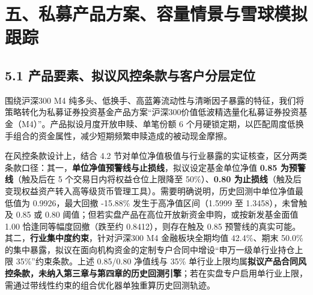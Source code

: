 \documentclass[12pt,a4paper]{article}
\let\origsection\section
\renewcommand{\section}[1]{\needspace{6.5\baselineskip}\origsection{#1}}
\let\origsubsection\subsection
\renewcommand{\subsection}[1]{\needspace{4\baselineskip}\origsubsection{#1}}
\begin{document}
\section{五、私募产品方案、容量情景与雪球模拟跟踪}

\subsection{5.1 产品要素、拟议风控条款与客户分层定位}

围绕沪深300 M4 纯多头、低换手、高蓝筹流动性与清晰因子暴露的特征，我们将策略转化为私募证券投资基金产品方案“沪深300价值低波精选量化私募证券投资基金（M4）”。产品拟设月度开放申赎、单笔份额 6 个月硬锁定期，以匹配周度低换手组合的资金属性，减少短期频繁申赎造成的被动现金摩擦。

在风控条款设计上，结合 4.2 节对单位净值极值与行业暴露的实证核查，区分两类条款口径：其一，\textbf{单位净值预警线与止损线}，拟议设定基金单位净值 \textbf{0.85 为预警线}（触及后在 5 个交易日内将权益仓位上限降至 50\%）、\textbf{0.80 为止损线}（触及后变现权益资产转入高等级货币管理工具）。需要明确说明，历史回测中单位净值最低值为 0.9926，最大回撤 -15.88\% 发生于高净值区间（1.5999 至 1.3458），未曾触及 0.85 或 0.80 阈值；但若实盘产品在高位开放新资金申购，或按新发基金面值 1.00 恰逢同等幅度回撤（跌至约 0.8412），则存在触及 0.85 预警线的真实可能。其二，\textbf{行业集中度约束}，针对沪深300 M4 金融板块全期均值 42.4\%、期末 50.0\% 的集中暴露，拟议在面向机构资金的定制专户合同中增设“申万一级单行业持仓上限 35\%”约束条款。上述 0.85/0.80 净值线与 35\% 单行业上限均属\textbf{拟议产品合同风控条款，未纳入第三章与第四章的历史回测引擎}；若在实盘专户启用单行业上限，需通过带线性约束的组合优化器单独重算历史回测轨迹。
\end{document}
